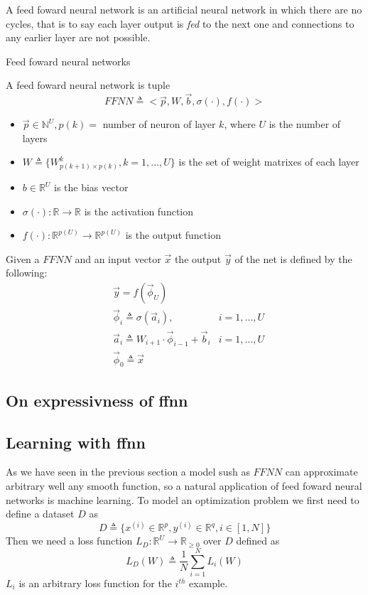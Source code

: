 
A feed foward neural network is an artificial neural network in which there are no cycles, that is to say each layer output is \textit{fed} to the next one and connections to any earlier layer are not possible. 


\begin{defn}{Feed foward neural networks}

A feed foward neural network is tuple
$$FFNN\triangleq<\vec{p},W,\vec{b},\sigma(\cdot),f(\cdot)>$$
\begin{itemize}
 \item $\vec{p} \in \mathbb{N}^U, p(k)=$ number of neuron of layer $k$, where $U$ is the number of layers
 \item $W\triangleq \{W^k_{p(k+1) \times p(k)}, k=1,...,U \}$ is the set of weight matrixes of each layer
 \item $b \in \mathbb{R}^{U}$ is the bias vector
 \item $\sigma(\cdot): \mathbb{R}\rightarrow \mathbb{R}$ is the activation function
 \item $f(\cdot): \mathbb{R}^{p(U)}\rightarrow \mathbb{R}^{p(U)}$ is the output function
\end{itemize}
\end{defn}

Given a $FFNN$ and an input vector $\vec{x}$ the output $\vec{y}$ of the net is defined by the following:
\begin{align}
&\vec{y}=f(\vec{\phi}_{U}) &\\
&\vec{\phi}_{i} \triangleq \sigma(\vec{a}_{i}), & i=1,...,U\\
&\vec{a}_{i} \triangleq W_{i+1} \cdot \vec{\phi}_{i-1} +\vec{b}_i  & i=1,...,U\\
&\vec{\phi}_{0} \triangleq \vec{x} &
\end{align}


\subsection{On expressivness of ffnn}
\subsection{Learning with ffnn}

As we have seen in the previous section a model sush as $FFNN$ can approximate arbitrary well any smooth function, so a natural application of feed foward neural networks is machine learning.
To model an optimization problem we first need to define a dataset $D$ as 
\begin{equation}
D\triangleq\{x^{(i)} \in \mathbb{R}^p, y^{(i)} \in \mathbb{R}^q,  i\in[1,N]\}
\end{equation}
Then we need a loss function $L_D:\mathbb{R}^U \rightarrow \mathbb{R}_{\geq 0}$ over $D$ defined as
\begin{equation}
L_D(W)\triangleq\frac{1}{N}\sum_{i=1}^N L_i(W) 
\end{equation}
$L_i$ is an arbitrary loss function for the $i^{th}$ example.



